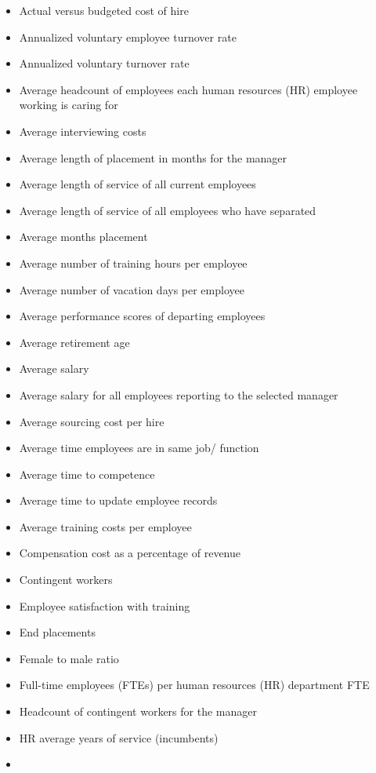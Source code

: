 \documentclass[]{book}
\providecommand{\tightlist}{%
  \setlength{\itemsep}{0pt}\setlength{\parskip}{0pt}}
\begin{document}
\begin{itemize}
\tightlist
\item
  Actual versus budgeted cost of hire
\item
  Annualized voluntary employee turnover rate
\item
  Annualized voluntary turnover rate
\item
  Average headcount of employees each human resources (HR) employee
  working is caring for
\item
  Average interviewing costs
\item
  Average length of placement in months for the manager
\item
  Average length of service of all current employees
\item
  Average length of service of all employees who have separated
\item
  Average months placement
\item
  Average number of training hours per employee
\item
  Average number of vacation days per employee
\item
  Average performance scores of departing employees
\item
  Average retirement age
\item
  Average salary
\item
  Average salary for all employees reporting to the selected manager
\item
  Average sourcing cost per hire
\item
  Average time employees are in same job/ function
\item
  Average time to competence
\item
  Average time to update employee records
\item
  Average training costs per employee
\item
  Compensation cost as a percentage of revenue
\item
  Contingent workers
\item
  Employee satisfaction with training
\item
  End placements
\item
  Female to male ratio
\item
  Full-time employees (FTEs) per human resources (HR) department FTE
\item
  Headcount of contingent workers for the manager
\item
  HR average years of service (incumbents)
\item

\end{itemize}
\end{document}
